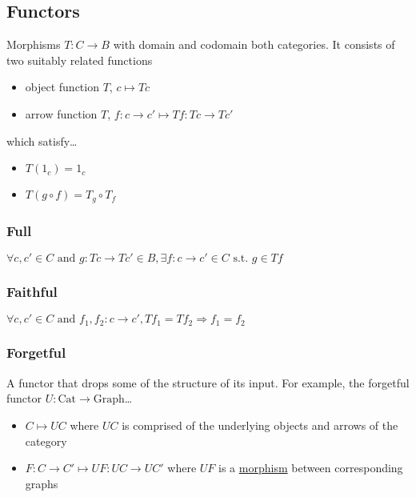 \subsection{Functors}\label{functor}
Morphisms $T: C \rightarrow B$ with domain and codomain both categories. It consists of two suitably related functions
\begin{itemize}
  \item object function $T$, $c \mapsto Tc$
  \item arrow function $T$, $f:c \rightarrow c' \mapsto Tf:Tc \rightarrow Tc'$
\end{itemize}
which satisfy\dots
\begin{itemize}
  \item $T(1_c) = 1_c$
  \item $T(g \circ f) = T_g \circ T_f$
\end{itemize}

\subsubsection{Full}\label{full}
$\forall c, c' \in C \textrm{ and } g:Tc \rightarrow Tc' \in B, \exists f:c \rightarrow c' \in C \textrm{ s.t. } g \in Tf$

\subsubsection{Faithful}\label{faithful}
$\forall c, c' \in C \textrm { and } f_1,f_2:c \rightarrow c', Tf_1 = Tf_2 \Rightarrow f_1=f_2$

\subsubsection{Forgetful}\label{forgetful}
A functor that drops some of the structure of its input. For example, the forgetful functor $U: \textrm{Cat} \rightarrow \textrm{Graph}$\dots
\begin{itemize}
  \item $C \mapsto UC$ where $UC$ is comprised of the underlying objects and arrows of the category
  \item $F:C \rightarrow C' \mapsto UF:UC \rightarrow UC'$ where $UF$ is a \hyperref[graphisomorphisms]{morphism} between corresponding graphs
\end{itemize}